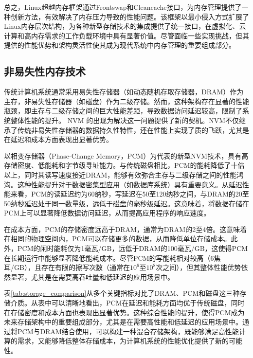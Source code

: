 总之，Linux超越内存框架通过Frontswap和Cleancache接口，为内存管理提供了一种创新方法，有效解决了内存压力导致的性能问题。该框架以最小侵入方式扩展了Linux内存层次结构，为各种新型存储技术的集成提供了统一接口，在虚拟化、云计算和高内存需求的工作负载环境中具有显著价值。尽管面临一些实现挑战，但其提供的性能优势和架构灵活性使其成为现代系统中内存管理的重要组成部分。

\subsection{非易失性内存技术}

传统计算机系统通常采用易失性存储器（如动态随机存取存储器，DRAM）作为主存，非易失性存储器（如磁盘）作为二级存储。然而，这种架构存在显著的性能瓶颈，即主存与二级存储之间的巨大性能差距，导致数据访问延迟较高，限制了系统整体性能的提升。 NVM 的出现为解决这一问题提供了新的契机。NVM不仅继承了传统非易失性存储器的数据持久性特性，还在性能上实现了质的飞跃，尤其是在延迟和成本方面表现出显著优势。

以相变存储器（Phase-Change Memory，PCM）为代表的新型NVM技术，具有高存储密度、低能耗和字节级寻址能力。与传统磁盘相比，PCM的能耗降低了十倍以上，同时其读写速度接近DRAM，能够有效弥合主存与二级存储之间的性能鸿沟。这种性能提升对于数据密集型应用（如数据库系统）具有重要意义。从延迟性能来看，PCM的读延迟约为60纳秒，写延迟在50至120纳秒之间，与DRAM的20至50纳秒延迟处于同一数量级，远低于磁盘的毫秒级延迟。这意味着，将数据存储在PCM上可以显著降低数据访问延迟，从而提高应用程序的响应速度。

在成本方面，PCM的存储密度远高于DRAM，通常为DRAM的2至4倍。这意味着在相同的物理空间内，PCM可以存储更多的数据，从而降低单位存储成本。此外，PCM的闲时能耗仅为1毫瓦/GB，远低于DRAM的100毫瓦/GB，这使得PCM在长期运行中能够显著降低能耗成本。尽管PCM的写能耗相对较高（6焦耳/GB），且存在有限的擦写次数（通常在$10^6$至$10^8$次之间），但其整体性能优势依然显著，尤其是在需要高吞吐量和低延迟的应用场景中。

表\ref{tab:storage_comparison}从多个关键指标对比了DRAM、PCM和磁盘这三种存储介质。从表中可以清晰地看出，PCM在延迟和能耗方面均优于传统磁盘，同时在存储密度和成本方面也表现出显著优势。这种综合性能的提升，使得PCM成为未来存储架构中的重要组成部分，尤其是在需要高性能和低延迟的应用场景中。通过将PCM与DRAM结合使用，可以构建一种混合存储架构，既能够满足高性能计算的需求，又能够降低整体存储成本，为计算机系统的性能优化提供了新的可能性。

